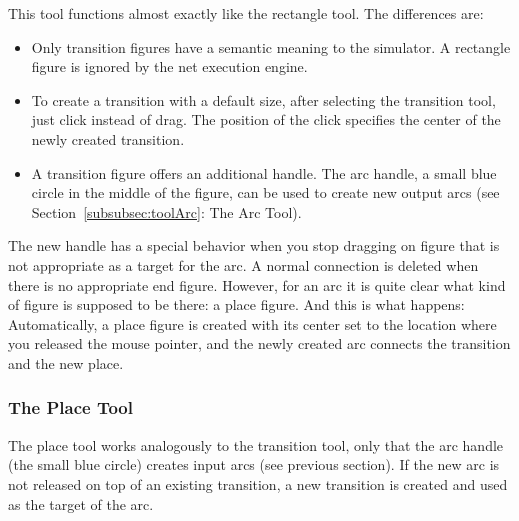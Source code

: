 This tool functions almost exactly like the rectangle tool.
The differences are:
\begin{itemize}
\item Only transition figures have a semantic meaning
      to the simulator. A rectangle figure is ignored by the net
      execution engine.
\item To create a transition with a default size, after selecting the 
      transition tool, just click instead of drag. The position of the 
      click specifies the center of the newly created transition.
\item A transition figure offers an additional handle. The arc handle,
      a small blue circle in the middle of the figure, can be used to
      create new output arcs (see Section~\ref{subsubsec:toolArc}:
      The Arc Tool).
\end{itemize}

The new handle has a special behavior when you stop dragging
on figure that is not appropriate as a target for the arc.
A normal connection is deleted when there is no
appropriate end figure. However, for an arc it is quite clear what kind
of figure is supposed to be there: a place figure. And this is what happens:
Automatically, a place figure is created with its center set to the location
where you released the mouse pointer, and the newly created arc connects
the transition and the new place.


\subsubsection{The Place Tool}

The place tool works analogously to the transition tool, only that
the arc handle (the small blue circle) creates input arcs (see
previous section). If the new arc is not released on top of an
existing transition, a new transition is created and used as the target
of the arc.

